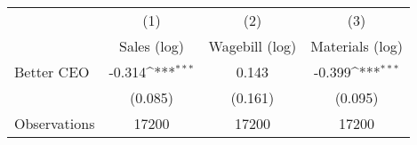 {
\def\sym#1{\ifmmode^{#1}\else\(^{#1}\)\fi}
\begin{tabular}{l*{3}{c}}
\hline\hline
                    &\multicolumn{1}{c}{(1)}&\multicolumn{1}{c}{(2)}&\multicolumn{1}{c}{(3)}\\
                    &\multicolumn{1}{c}{Sales (log)}&\multicolumn{1}{c}{Wagebill (log)}&\multicolumn{1}{c}{Materials (log)}\\
\hline
Better CEO          &      -0.314\sym{***}&       0.143         &      -0.399\sym{***}\\
                    &     (0.085)         &     (0.161)         &     (0.095)         \\
\hline
Observations        &       17200         &       17200         &       17200         \\
\hline\hline
\end{tabular}
}
